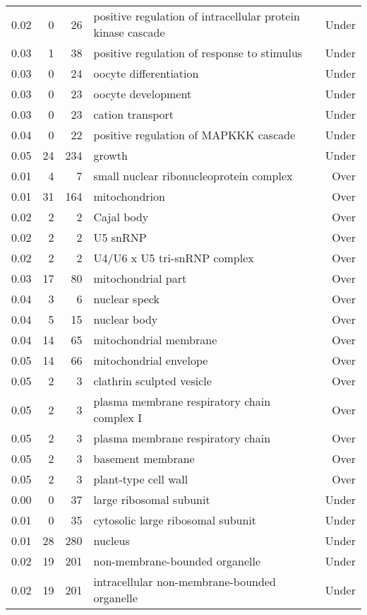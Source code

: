 \documentclass[10pt]{bmc_article}
\newenvironment{bmcformat}{\begin{raggedright}\baselineskip20pt\sloppy\setboolean{publ}{false}}{\end{raggedright}\baselineskip20pt\sloppy}
\begin{document}
\begin{bmcformat}
\begin{longtable}{rrrp{4cm}r}
  0.02 &   0 &  26 & positive regulation of intracellular protein kinase cascade & Under \\ 
  0.03 &   1 &  38 & positive regulation of response to stimulus & Under \\ 
  0.03 &   0 &  24 & oocyte differentiation & Under \\ 
  0.03 &   0 &  23 & oocyte development & Under \\ 
  0.03 &   0 &  23 & cation transport & Under \\ 
  0.04 &   0 &  22 & positive regulation of MAPKKK cascade & Under \\ 
  0.05 &  24 & 234 & growth & Under \\ 
   \hline
0.01 &   4 &   7 & small nuclear ribonucleoprotein complex & Over \\ 
  0.01 &  31 & 164 & mitochondrion & Over \\ 
  0.02 &   2 &   2 & Cajal body & Over \\ 
  0.02 &   2 &   2 & U5 snRNP & Over \\ 
  0.02 &   2 &   2 & U4/U6 x U5 tri-snRNP complex & Over \\ 
  0.03 &  17 &  80 & mitochondrial part & Over \\ 
  0.04 &   3 &   6 & nuclear speck & Over \\ 
  0.04 &   5 &  15 & nuclear body & Over \\ 
  0.04 &  14 &  65 & mitochondrial membrane & Over \\ 
  0.05 &  14 &  66 & mitochondrial envelope & Over \\ 
  0.05 &   2 &   3 & clathrin sculpted vesicle & Over \\ 
  0.05 &   2 &   3 & plasma membrane respiratory chain complex I & Over \\ 
  0.05 &   2 &   3 & plasma membrane respiratory chain & Over \\ 
  0.05 &   2 &   3 & basement membrane & Over \\ 
  0.05 &   2 &   3 & plant-type cell wall & Over \\ 
  0.00 &   0 &  37 & large ribosomal subunit & Under \\ 
  0.01 &   0 &  35 & cytosolic large ribosomal subunit & Under \\ 
  0.01 &  28 & 280 & nucleus & Under \\ 
  0.02 &  19 & 201 & non-membrane-bounded organelle & Under \\ 
  0.02 &  19 & 201 & intracellular non-membrane-bounded organelle & Under \\ 

\end{longtable}
\end{bmcformat}
\end{document}
